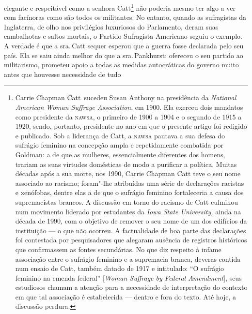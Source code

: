 elegante e respeitável como a senhora Catt\footnote{Carrie Chapman
  Catt~sucedeu Susan Anthony na presidência da \emph{National American}
  \emph{Woman Suffrage Association}, em 1900. Ela exerceu dois mandatos
  como presidente da \textsc{nawsa}, o primeiro de 1900 a 1904 e o segundo de
  1915 a 1920, sendo, portanto, presidente no ano em que o presente
  artigo foi redigido e publicado. Sob a liderança de Catt, a \textsc{nawsa}
  pautava a sua defesa do sufrágio feminino na concepção ampla e
  repetidamente combatida por Goldman: a de que as mulheres,
  essencialmente diferentes dos homens, trariam as suas virtudes
  domésticas de modo a purificar a política. Muitas décadas após a sua
  morte, nos 1990, Carrie Chapman Catt teve o seu nome associado ao
  racismo; foram"-lhe atribuídas uma série de declarações racistas e
  xenófobas, dentre elas a de que o sufrágio feminino fortaleceria a
  causa dos supremacistas brancos. A discussão em torno do racismo de
  Catt culminou num movimento liderado por estudantes da \emph{Iowa
  State University,} ainda na década de 1990, com o objetivo de remover
  o seu nome de um dos edifícios da instituição --- o que não ocorreu. A
  factualidade de boa parte das declarações foi contestada por
  pesquisadores que alegaram ausência de registros históricos que
  confirmassem as fontes secundárias. No que diz respeito à infame
  associação entre o sufrágio feminino e a supremacia branca, deveras
  contida num ensaio de Catt, também datado de 1917 e intitulado: ``O
  sufrágio feminino na emenda federal'' {[}\emph{Woman Suffrage by
  Federal Amendment}{]}, seus estudiosos chamam a atenção para a
  necessidade de interpretação do contexto em que tal associação é
  estabelecida --- dentro e fora do texto. Até hoje, a discussão perdura.}
não poderia mesmo ter algo a ver com facínoras como são todos os
militantes. No entanto, quando as sufragistas da Inglaterra, de olho nos
privilégios luxuriosos do Parlamento, deram suas cambalhotas e saltos
mortais, o Partido Sufragista Americano seguiu o exemplo. A verdade é
que a sra.\,Catt sequer esperou que a guerra fosse declarada pelo seu
país. Ela se saiu ainda melhor do que a sra.\,Pankhurst: ofereceu o seu
partido ao militarismo, prometeu apoio a todas as medidas autocráticas
do governo muito antes que houvesse necessidade de tudo
